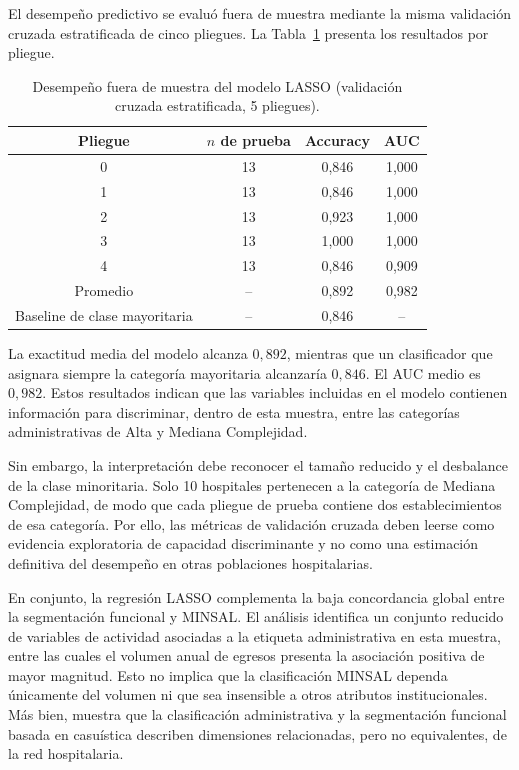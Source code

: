 El desempeño predictivo se evaluó fuera de muestra mediante la misma validación
cruzada estratificada de cinco pliegues. La Tabla~\ref{tab:lasso-desempeno}
presenta los resultados por pliegue.

\begin{table}[htbp]
\centering
\caption{Desempeño fuera de muestra del modelo LASSO (validación cruzada estratificada, 5 pliegues).}
\label{tab:lasso-desempeno}
\begin{tabular}{c c c c}
\toprule
\textbf{Pliegue} & \textbf{$n$ de prueba} &
\textbf{Accuracy} & \textbf{AUC} \\
\midrule
0 & 13 & 0,846 & 1,000 \\
1 & 13 & 0,846 & 1,000 \\
2 & 13 & 0,923 & 1,000 \\
3 & 13 & 1,000 & 1,000 \\
4 & 13 & 0,846 & 0,909 \\
\midrule
Promedio & -- & 0,892 & 0,982 \\
Baseline de clase mayoritaria & -- & 0,846 & -- \\
\bottomrule
\end{tabular}
\end{table}

La exactitud media del modelo alcanza $0{,}892$, mientras que un clasificador
que asignara siempre la categoría mayoritaria alcanzaría $0{,}846$. El AUC
medio es $0{,}982$. Estos resultados indican que las variables incluidas en el
modelo contienen información para discriminar, dentro de esta muestra, entre
las categorías administrativas de Alta y Mediana Complejidad.

Sin embargo, la interpretación debe reconocer el tamaño reducido y el
desbalance de la clase minoritaria. Solo 10 hospitales pertenecen a la categoría
de Mediana Complejidad, de modo que cada pliegue de prueba contiene dos
establecimientos de esa categoría. Por ello, las métricas de validación cruzada
deben leerse como evidencia exploratoria de capacidad discriminante y no como
una estimación definitiva del desempeño en otras poblaciones hospitalarias.

En conjunto, la regresión LASSO complementa la baja concordancia global entre la
segmentación funcional y MINSAL. El análisis identifica un conjunto reducido de
variables de actividad asociadas a la etiqueta administrativa en esta muestra,
entre las cuales el volumen anual de egresos presenta la asociación positiva de
mayor magnitud. Esto no implica que la clasificación MINSAL dependa únicamente
del volumen ni que sea insensible a otros atributos institucionales. Más bien,
muestra que la clasificación administrativa y la segmentación funcional basada
en casuística describen dimensiones relacionadas, pero no equivalentes, de la
red hospitalaria.


